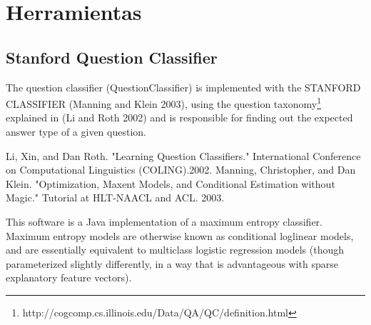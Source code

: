\appendix
\chapter{Herramientas}

\section{Stanford Question Classifier}
\label{sec:stanford-qc}
The question classifier (QuestionClassifier) is implemented with the 
STANFORD CLASSIFIER (Manning and Klein 2003), using the question taxonomy\footnote{http://cogcomp.cs.illinois.edu/Data/QA/QC/definition.html} 
explained in (Li and Roth 2002) and is responsible for finding out the expected 
answer type of a given question.

Li, Xin, and Dan Roth. "Learning Question Classifiers." International Conference 
on Computational Linguistics (COLING).2002.
Manning, Christopher, and Dan Klein. "Optimization, Maxent Models, and 
Conditional Estimation without Magic." Tutorial at HLT-NAACL and ACL. 2003.

This software is a Java implementation of a maximum entropy classifier.
Maximum entropy models are otherwise known as conditional loglinear
models, and are essentially equivalent to multiclass logistic
regression models (though parameterized slightly differently, in a way
that is advantageous with sparse explanatory feature vectors). 

